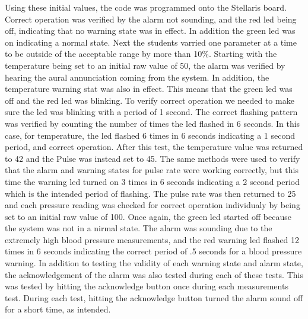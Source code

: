 \documentclass[12pt]{article} %
\begin{document}
Using these initial values, the code was programmed onto the Stellaris board.
Correct operation was verified by the alarm not sounding, and the red led being
off, indicating that no warning state was in effect. In addition the green led
was on indicating a normal state. Next the students varried one parameter at a
time to be outside of the acceptable range by more than 10\%. Starting with the
temperature being set to an initial raw value of 50, the alarm was verified by
hearing the aural annunciation coming from the system. In addition, the
temperature warning stat was also in effect. This means that the green led was
off and the red led was blinking. To verify correct operation we needed to make
sure the led was blinking with a period of 1 second. The correct flashing
pattern was verified by counting the number of times the led flashed in 6
seconds. In this case, for temperature, the led flashed 6 times in 6 seconds
indicating a 1 second period, and correct operation. After this test, the
temperature value was returned to 42 and the Pulse was instead set to 45. The
same methods were used to verify that the alarm and warning states for pulse
rate were working correctly, but this time the warning led turned on 3 times in
6 seconds indicating a 2 second period which is the intended period of
flashing. The pulse rate was then returned to 25 and each pressure reading was
checked for correct operation individualy by being set to an initial raw value
of 100. Once again, the green led started off because the system was not in a
nirmal state. The alarm was sounding due to the extremely high blood pressure
measurements, and the red warning led flashed 12 times in 6 seconds indicating
the correct period of .5 seconds for a blood pressure warning. In addition to
testing the validity of each warning state and alarm state, the acknowledgement
of the alarm was also tested during each of these tests. This was tested by
hitting the acknowledge button once during each measurements test. During each
test, hitting the acknowledge button turned the alarm sound off for a short
time, as intended. 
\end{document}
